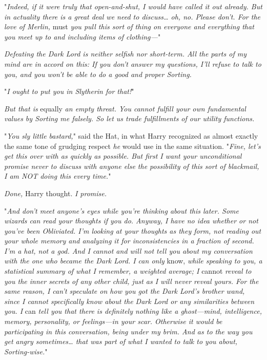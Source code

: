 "\emph{Indeed, if it were truly that open-and-shut, I would have called it out 
already. But in actuality there is a great deal we need to discuss{\ldots} oh, 
no. Please don't. For the love of Merlin,} must\emph{ you pull this sort of 
thing on everyone and everything that you meet up to and including items of 
clothing---}"

\emph{Defeating the Dark Lord is neither selfish nor short-term. All the parts 
of my mind are in accord on this: If you don't answer my questions, I'll refuse 
to talk to you, and you won't be able to do a good and proper Sorting.}

"\emph{I ought to put you in Slytherin for that!}"

\emph{But that is} equally\emph{ an empty threat. You cannot fulfill your own 
fundamental values by Sorting me falsely. So let us trade fulfillments of our 
utility functions.}

"\emph{You sly little bastard,}" said the Hat, in what Harry recognized as 
almost exactly the same tone of grudging respect \emph{he} would use in the 
same situation. "\emph{Fine, let's get this over with as quickly as possible. 
But first I want your unconditional promise never to discuss with anyone else 
the possibility of this sort of blackmail, I am NOT doing this every time.}"

\emph{Done,} Harry thought. \emph{I promise.}

"\emph{And don't meet anyone's eyes while you're thinking about this later. 
Some wizards can read your thoughts if you do. Anyway, I have no idea whether 
or not you've been Obliviated. I'm looking at your thoughts as they form, not 
reading out your whole memory and analyzing it for inconsistencies in a 
fraction of second. I'm a hat, not a god. And I cannot and will not tell you 
about my conversation with the one who became the Dark Lord. I can only} 
know,\emph{ while speaking to you, a statistical summary of what I remember, a 
weighted average; I} cannot\emph{ reveal to you the inner secrets of any other 
child, just as I will never reveal yours. For the same reason, I can't 
speculate on how you got the Dark Lord's brother wand, since I cannot 
specifically know about the Dark Lord or any similarities between you. I} 
can\emph{ tell you that there is definitely nothing like a ghost---mind, 
intelligence, memory, personality, or feelings---in your scar. Otherwise it 
would be participating in this conversation, being under my brim. And as to the 
way you get angry sometimes{\ldots} that was part of what I wanted to talk to 
you about, Sorting-wise.}"

